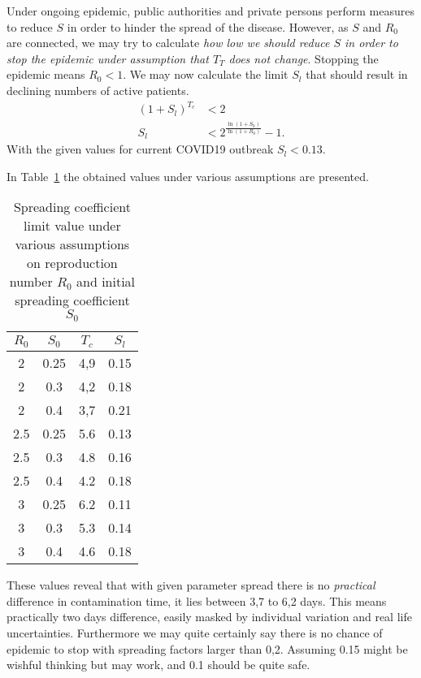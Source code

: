 Under ongoing epidemic, public authorities and private persons perform
measures to reduce $S$ in order to hinder the spread of the disease. However,
as $S$ and $R_0$ are connected, we may try to calculate \emph{how low we should
reduce $S$ in order to stop the epidemic under assumption that $T_T$ does not
change}. Stopping the epidemic means $R_0< 1$. We may now calculate the limit
$S_l$ that should result in declining numbers of active patients.
\begin{align}
    {\left(1+S_l\right)}^{T_c}&<2\\
    S_l&<2^{\frac{\ln\left(1+S_0\right)}{\ln\left(1+R_0\right)}}-1.
\end{align}
With the given values for current COVID19 outbreak $S_l<0.13$. 

In Table~\ref{tab:variants} the obtained values under various assumptions are
presented.
\begin{table}[h!]
  \begin{center}
      \caption{Spreading coefficient limit value under various assumptions on
      reproduction number $R_0$ and initial spreading coefficient $S_0$}\label{tab:variants}
   \begin{tabular}{c|c|c|c} %
        \textbf{$R_0$} & \textbf{$S_0$} & \textbf{$T_c$} & \textbf{$S_l$}\\
      \hline
      2 &0.25&4,9&0.15 \\
      2 &0.3&4,2&0.18\\
      2 &0.4&3,7&0.21\\
      2.5&0.25&5.6&0.13\\
      2.5&0.3&4.8&0.16\\
      2.5&0.4&4.2&0.18\\
      3 &0.25&6.2&0.11\\
      3 &0.3&5.3&0.14\\
      3 &0.4&4.6&0.18\\
    \end{tabular}
  \end{center}
\end{table}
These values reveal that with given parameter spread there is no
\emph{practical} difference in contamination time, it lies between 3,7 to 6,2
days. This means practically two days difference, easily masked by individual
variation and real life uncertainties. 
Furthermore we may quite
certainly say there is no chance of epidemic to stop with spreading factors
larger than 0,2. Assuming 0.15 might be wishful thinking but may work, and 0.1 should be
quite safe. 

